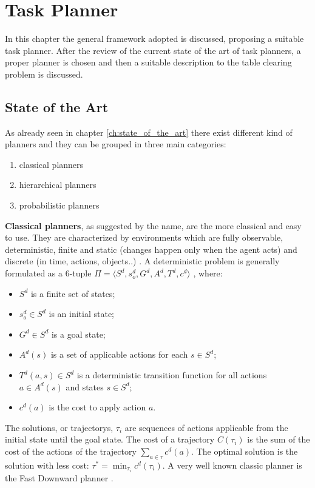 \chapter{Task Planner}
\label{ch:task_planner}
In this chapter the general framework adopted is discussed, proposing a suitable task planner. After the  review of the current state of the art of task planners, a proper planner is chosen and then a suitable description to the table clearing problem is discussed.
\section{State of the Art}
As already seen in chapter \ref{ch:state_of_the_art} there exist different kind of planners and they can be grouped in three main categories:
\begin{enumerate}
\item classical planners
\item hierarchical planners
\item probabilistic planners
\end{enumerate}
\textbf{Classical planners}, as suggested by the name, are the more classical and easy to use. They are characterized by environments which are fully observable, deterministic, finite and static (changes happen only when the agent acts) and discrete (in time, actions, objects..) \citep{artificialIntelligence}.
A deterministic problem is generally formulated as a $6$-tuple $\Pi=\langle S^d, s_o^d, G^d, A^d, T^d, c^d \rangle$ \cite{little2007probabilistic}, where:
\begin{itemize}
\item $S^d$ is a finite set of states;
\item $s_o^d \in S^d$ is an initial state;
\item $G^d \in S^d$ is a goal state;
\item $A^d(s)$ is a set of applicable actions for each $s \in S^d$;
\item $T^d(a,s) \in S^d$ is a deterministic transition function for all actions $a \in A^d(s)$ and states $ s \in S^d$;
\item $c^d(a)$ is the cost to apply action $a$. 
\end{itemize}
The solutions, or trajectorys, $\tau_i$ are sequences of actions applicable from the initial state until the goal state. The cost of a trajectory $C(\tau_i)$ is the sum of the cost of the actions of the trajectory $\sum_{a \in \tau} c^d(a)$. The optimal solution is the solution with less cost: $\tau^* = \min_{\tau_i} c^d(\tau_i)$. A very well known classic planner is the Fast Downward planner \cite{helmert2006fast}.

